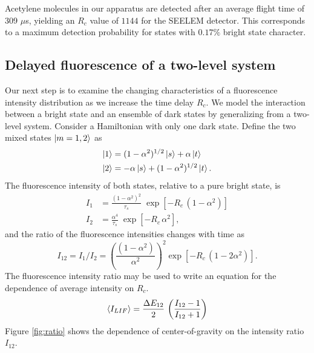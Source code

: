 \documentclass[12pt]{mitthesis}
\begin{document}
Acetylene molecules in our apparatus are detected after an average
flight time of 309 $\mu$s, yielding an $R_c$ value of $1144$ for the
SEELEM detector.  This corresponds to a maximum detection probability
for states with $0.17\%$ bright state character.

\subsection{Delayed fluorescence of a two-level system}

Our next step is to examine the changing characteristics of a
fluorescence intensity distribution as we increase the time delay
$R_c$.  We model the interaction between a bright state and an
ensemble of dark states by generalizing from a two-level system.
Consider a Hamiltonian with only one dark state.  Define the two mixed
states $\mathinner{|{m=1,2}\rangle}$ as
\begin{equation}
  \begin{split}
    \mathinner{|{1}\rangle} &=  (1 - \alpha^2)^{1/2} \mathinner{|{s}\rangle} + \alpha \mathinner{|{t}\rangle}\\
    \mathinner{|{2}\rangle} &= -\alpha \mathinner{|{s}\rangle} + (1 - \alpha^2)^{1/2} \mathinner{|{t}\rangle}.
  \end{split}
\end{equation}
The fluorescence intensity of both states, relative to a pure bright
state, is
\begin{equation}
  \begin{split}
    I_1 &= \frac{(1 - \alpha^2)^2}{\tau_s} \; \exp 
          \left[
            - R_c \, (1 - \alpha^2)
          \right]\\
    I_2 &= \frac{\alpha^4}{\tau_s} \; \exp 
          \left[
            - R_c \, \alpha^2
          \right],
  \end{split}
\end{equation}
and the ratio of the fluorescence intensities changes with time as
\begin{equation}
  I_{12} = I_1 / I_2 = 
  \left(
    \frac{(1 - \alpha^2)}{\alpha^2}
  \right)^2
  \exp
  \left[
    - R_c \, (1 - 2\alpha^2)
  \right].
\end{equation}
The fluorescence intensity ratio may be used to write an equation for
the dependence of average intensity on $R_c$.
\begin{equation}
  \label{eq:ratio}
  \mathinner{\langle{I_{LIF}}\rangle} = 
  \frac{\Delta E_{12}}{2} \,
  \left(
    \frac{I_{12}-1}{I_{12}+1}
  \right)
\end{equation}
Figure \ref{fig:ratio} shows the dependence of center-of-gravity on
the intensity ratio $I_{12}$.
\end{document}
